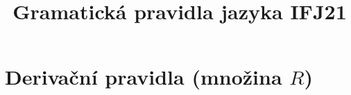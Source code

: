 \documentclass[a4paper]{article}
\title{Gramatická pravidla jazyka IFJ21}
\theoremstyle{definition}
\newtheorem{definition}{Definice}
\newcommand{\nter}[1]{\textcolor{blue}{\,#1\,}}
\newcommand{\ter}[1]{\textbf{\textcolor{red}{\,#1\,}}}
\begin{document}
	\maketitle



			

	\section{Derivační pravidla (množina $R$)}
\end{document}
